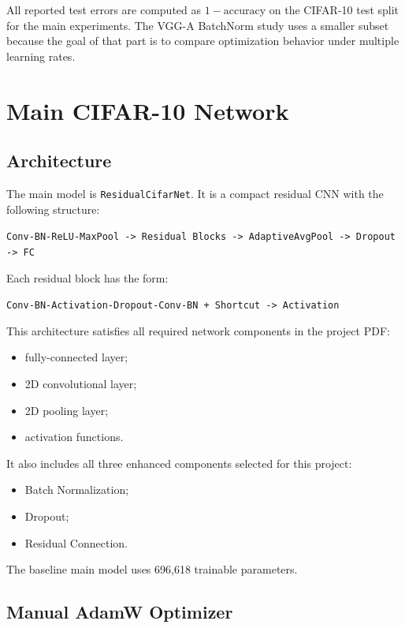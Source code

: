 \documentclass[12pt]{article}
\begin{document}
All reported test errors are computed as $1-\text{accuracy}$ on the CIFAR-10 test split for the main experiments. The VGG-A BatchNorm study uses a smaller subset because the goal of that part is to compare optimization behavior under multiple learning rates.

\section{Main CIFAR-10 Network}

\subsection{Architecture}

The main model is \texttt{ResidualCifarNet}. It is a compact residual CNN with the following structure:

\begin{center}
\texttt{Conv-BN-ReLU-MaxPool -> Residual Blocks -> AdaptiveAvgPool -> Dropout -> FC}
\end{center}

Each residual block has the form:

\begin{center}
\texttt{Conv-BN-Activation-Dropout-Conv-BN + Shortcut -> Activation}
\end{center}

This architecture satisfies all required network components in the project PDF:

\begin{itemize}
    \item fully-connected layer;
    \item 2D convolutional layer;
    \item 2D pooling layer;
    \item activation functions.
\end{itemize}

It also includes all three enhanced components selected for this project:

\begin{itemize}
    \item Batch Normalization;
    \item Dropout;
    \item Residual Connection.
\end{itemize}

The baseline main model uses 696,618 trainable parameters.

\subsection{Manual AdamW Optimizer}
\end{document}
